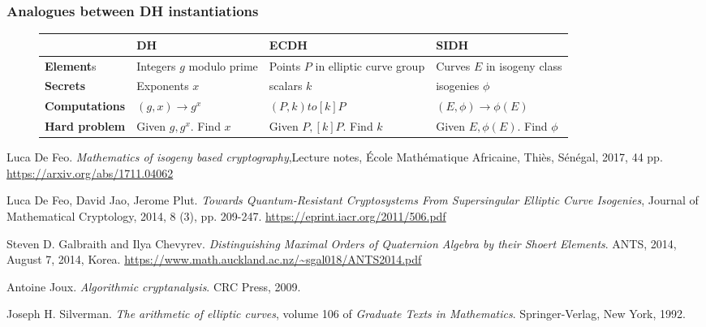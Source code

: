 \documentclass{beamer}
\begin{document}
\begin{frame}
\frametitle{Analogues between DH instantiations}
\begin{figure}[h]
	\begin{center}
		\begin{tabular}{| m{2.3cm} | m{2.5cm} m{2.5cm} m{2.5cm} |}
			\hline
			~ & DH & ECDH & SIDH\\
			\hline
			\textbf{Element}s & Integers $g$ modulo prime & Points $P$ in elliptic curve group & Curves $E$ in isogeny class\\
			\hline
			\textbf{Secrets} & Exponents $x$ & scalars $k$ & isogenies $\phi$ \\
			\hline
			\textbf{Computations} & $(g, x) \to g^x$ & $(P, k) to [k]P$ & $(E, \phi) \to \phi(E)$\\
			\hline
			\textbf{Hard problem} & Given $g, g^x$. Find $x$ & Given $P,[k]P$. Find $k$ & Given $E, \phi(E)$. Find $\phi$\\
			\hline 
		\end{tabular}
	\end{center}
\end{figure}
\end{frame}

\begin{frame}
	\begin{thebibliography}
		 Luca De Feo. \textit{Mathematics of isogeny based cryptography},Lecture notes, École Mathématique Africaine, Thiès, Sénégal, 2017, 44 pp. \url{https://arxiv.org/abs/1711.04062}
		
		 Luca De Feo, David Jao, Jerome Plut. \textit{Towards Quantum-Resistant Cryptosystems From Supersingular Elliptic Curve Isogenies}, Journal of Mathematical Cryptology, 2014, 8 (3), pp. 209-247. \url{https://eprint.iacr.org/2011/506.pdf}
		
		 Steven D. Galbraith and Ilya Chevyrev. \textit{Distinguishing Maximal Orders of Quaternion Algebra by their Shoert Elements}. ANTS, 2014, August 7, 2014, Korea. \url{https://www.math.auckland.ac.nz/~sgal018/ANTS2014.pdf}
		
		 Antoine Joux. \textit{Algorithmic cryptanalysis}. CRC Press, 2009.
		
		 Joseph H. Silverman. \textit{The arithmetic of elliptic curves}, volume 106 of \textit{Graduate Texts in Mathematics}. Springer-Verlag, New York, 1992.
	\end{thebibliography}
\end{frame}
\end{document}
